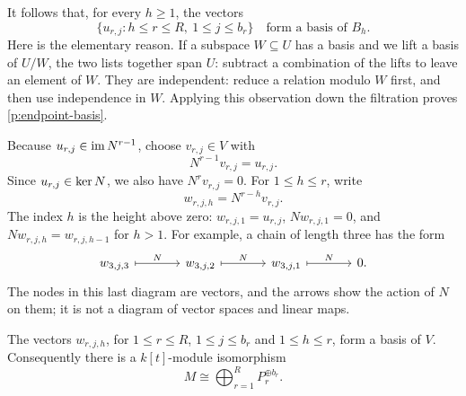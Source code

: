 It follows that, for every $h\geq1$, the vectors
\begin{equation}
\label{p:endpoint-basis}
 \{u_{r,j}:h\leq r\leq R,\ 1\leq j\leq b_r\}
 \quad\text{form a basis of } B_h.
\end{equation}
Here is the elementary reason. If a subspace $W\subseteq U$ has a basis and
we lift a basis of $U/W$, the two lists together span $U$: subtract a
combination of the lifts to leave an element of $W$. They are independent:
reduce a relation modulo $W$ first, and then use independence in $W$.
Applying this observation down the filtration proves
\eqref{p:endpoint-basis}.

Because $u_{r,j}\in\operatorname{im} N^{r-1}$, choose $v_{r,j}\in V$ with
\[
 N^{r-1}v_{r,j}=u_{r,j}.
\]
Since $u_{r,j}\in\operatorname{ker} N$, we also have $N^rv_{r,j}=0$. For
$1\leq h\leq r$, write
\[
 w_{r,j,h}=N^{r-h}v_{r,j}.
\]
The index $h$ is the height above zero: $w_{r,j,1}=u_{r,j}$,
$Nw_{r,j,1}=0$, and $Nw_{r,j,h}=w_{r,j,h-1}$ for $h>1$.
For example, a chain of length three has the form
\[
\begin{tikzcd}[column sep=large]
 w_{3,j,3} \arrow[r,mapsto,"N"] &
 w_{3,j,2} \arrow[r,mapsto,"N"] &
 w_{3,j,1} \arrow[r,mapsto,"N"] &0.
\end{tikzcd}
\]
The nodes in this last diagram are vectors, and the arrows show the action
of $N$ on them; it is not a diagram of vector spaces and linear maps.

\begin{theorem}
\label{p:chain-basis}
The vectors $w_{r,j,h}$, for $1\leq r\leq R$, $1\leq j\leq b_r$ and
$1\leq h\leq r$, form a basis of $V$.
Consequently there is a $k[t]$-module isomorphism
\[
 M\cong\bigoplus_{r=1}^{R}P_r^{\oplus b_r}.
\]
\end{theorem}

